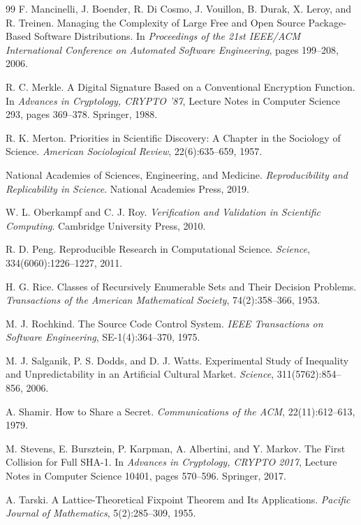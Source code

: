 \documentclass[11pt,twoside,openright]{book}
\theoremstyle{plain}
\theoremstyle{definition}
\theoremstyle{remark}
\begin{document}
\begin{thebibliography}{99}
 F. Mancinelli, J. Boender, R. Di Cosmo, J. Vouillon, B. Durak, X. Leroy, and R. Treinen. Managing the Complexity of Large Free and Open Source Package-Based Software Distributions. In \emph{Proceedings of the 21st IEEE/ACM International Conference on Automated Software Engineering}, pages 199--208, 2006.

 R. C. Merkle. A Digital Signature Based on a Conventional Encryption Function. In \emph{Advances in Cryptology, CRYPTO '87}, Lecture Notes in Computer Science 293, pages 369--378. Springer, 1988.

 R. K. Merton. Priorities in Scientific Discovery: A Chapter in the Sociology of Science. \emph{American Sociological Review}, 22(6):635--659, 1957.

 National Academies of Sciences, Engineering, and Medicine. \emph{Reproducibility and Replicability in Science}. National Academies Press, 2019.

 W. L. Oberkampf and C. J. Roy. \emph{Verification and Validation in Scientific Computing}. Cambridge University Press, 2010.

 R. D. Peng. Reproducible Research in Computational Science. \emph{Science}, 334(6060):1226--1227, 2011.

 H. G. Rice. Classes of Recursively Enumerable Sets and Their Decision Problems. \emph{Transactions of the American Mathematical Society}, 74(2):358--366, 1953.

 M. J. Rochkind. The Source Code Control System. \emph{IEEE Transactions on Software Engineering}, SE-1(4):364--370, 1975.

 M. J. Salganik, P. S. Dodds, and D. J. Watts. Experimental Study of Inequality and Unpredictability in an Artificial Cultural Market. \emph{Science}, 311(5762):854--856, 2006.

 A. Shamir. How to Share a Secret. \emph{Communications of the ACM}, 22(11):612--613, 1979.

 M. Stevens, E. Bursztein, P. Karpman, A. Albertini, and Y. Markov. The First Collision for Full SHA-1. In \emph{Advances in Cryptology, CRYPTO 2017}, Lecture Notes in Computer Science 10401, pages 570--596. Springer, 2017.

 A. Tarski. A Lattice-Theoretical Fixpoint Theorem and Its Applications. \emph{Pacific Journal of Mathematics}, 5(2):285--309, 1955.


\end{thebibliography}
\end{document}

